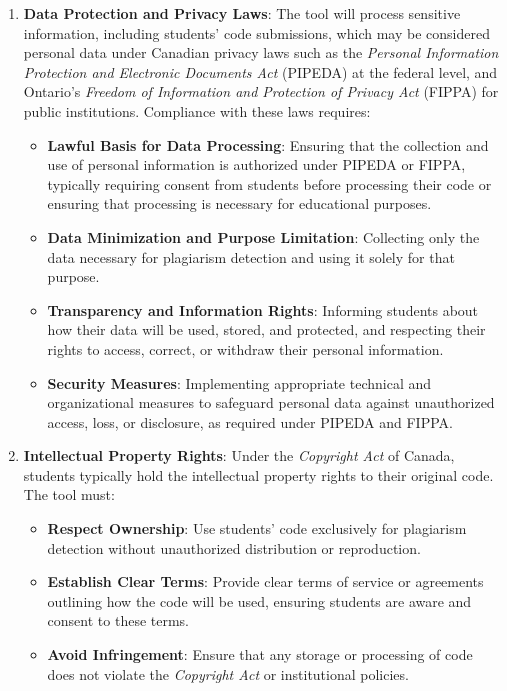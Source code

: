\documentclass[12pt]{article}
\begin{document}
\begin{enumerate}
    \item \textbf{Data Protection and Privacy Laws}: The tool will process sensitive
    information, including students' code submissions, which may be considered personal
    data under Canadian privacy laws such as the \textit{Personal Information Protection 
    and Electronic Documents Act} (PIPEDA) at the federal level, and Ontario's \textit{Freedom of 
    Information and Protection of Privacy Act} (FIPPA) for public institutions. Compliance with these 
    laws requires:
    \begin{itemize}
        \item \textbf{Lawful Basis for Data Processing}: Ensuring that the collection and use of 
        personal information is authorized under PIPEDA or FIPPA, typically requiring consent from 
        students before processing their code or ensuring that processing is necessary for educational purposes.
        \item \textbf{Data Minimization and Purpose Limitation}: Collecting only the data
        necessary for plagiarism detection and using it solely for that purpose.
        \item \textbf{Transparency and Information Rights}: Informing students about how
        their data will be used, stored, and protected, and respecting their rights to
        access, correct, or withdraw their personal information.
        \item \textbf{Security Measures}: Implementing appropriate technical and
        organizational measures to safeguard personal data against unauthorized access,
        loss, or disclosure, as required under PIPEDA and FIPPA.
    \end{itemize}

    \item \textbf{Intellectual Property Rights}: Under the \textit{Copyright Act} of Canada, 
    students typically hold the intellectual property rights to their original code. 
    The tool must:
    \begin{itemize}
        \item \textbf{Respect Ownership}: Use students' code exclusively for plagiarism
        detection without unauthorized distribution or reproduction.
        \item \textbf{Establish Clear Terms}: Provide clear terms of service or agreements
        outlining how the code will be used, ensuring students are aware and consent to
        these terms.
        \item \textbf{Avoid Infringement}: Ensure that any storage or processing of code
        does not violate the \textit{Copyright Act} or institutional policies.
    \end{itemize}


\end{enumerate}
\end{document}
